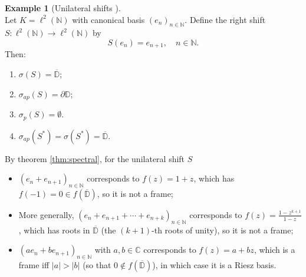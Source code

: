 \documentclass[a4paper,11pt]{article}
\theoremstyle{plain}
\theoremstyle{definition}
\newtheorem{example}[theorem]{Example}
\theoremstyle{remark}
\begin{document}
\begin{example}[Unilateral shifts \cite{Halmos1961,Nikolski2002}]
\label{ExWeightedShift}
\mbox{} \\
Let $K = \ell^2(\mathbb{N})$ with canonical basis $(e_n)_{n \in \mathbb{N}}$. Define the right shift $S: \ell^2(\mathbb{N}) \to \ell^2(\mathbb{N})$ by
\[S(e_n) =  e_{n+1}, \quad n \in \mathbb{N}.\]
Then:
\begin{enumerate}[label=(\roman*)]
\item $\sigma(S) = \overline{\mathbb{D}}$; 
\item $\sigma_{ap}(S) = \partial \mathbb{D}$;
\item $\sigma_p(S) = \emptyset$.
\item $\sigma_{ap}(S^*) = \sigma(S^*) = \overline{\mathbb{D}}$.
\end{enumerate}
By theorem \ref{thm:spectral}, for the unilateral shift $S$
\begin{itemize}
\item $(e_n + e_{n+1})_{n \in \mathbb{N}}$ corresponds to $f(z) = 1 + z$, which has $f(-1) = 0 \in f(\overline{\mathbb{D}})$, so it is not a frame;
\item More generally, $(e_n + e_{n+1} + \cdots + e_{n+k})_{n \in \mathbb{N}}$ corresponds to $f(z) = \frac{1 - z^{k+1}}{1 - z}$, which has roots in $\overline{\mathbb{D}}$ (the $(k+1)$-th roots of unity), so it is not a frame;
\item $(ae_n + be_{n+1})_{n \in \mathbb{N}}$ with $a, b \in \mathbb{C}$ corresponds to $f(z) = a + bz$, which is a frame iff $|a| > |b|$ (so that $0 \notin f(\overline{\mathbb{D}})$), in which case it is a Riesz basis.
\end{itemize}
\end{example}
\end{document}
